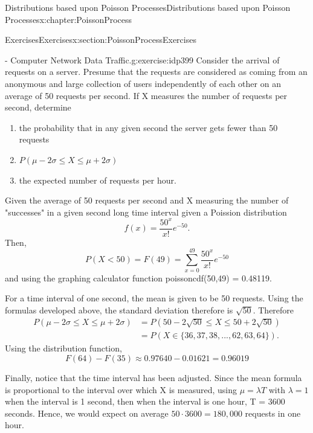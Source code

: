\documentclass[oneside,10pt,]{book}
\numberwithin{equation}{section}
\newcommand{\lt}{<}
\begin{document}
\begin{chapterptx}{Distributions based upon Poisson Processes}{}{Distributions based upon Poisson Processes}{}{}{x:chapter:PoissonProcess}
\begin{sectionptx}{Exercises}{}{Exercises}{}{}{x:section:PoissonProcessExercises}
\begin{inlineexercise}{- Computer Network Data Traffic.}{g:exercise:idp399}
Consider the arrival of requests on a server. Presume that the requests are considered as coming from an anonymous and large collection of users independently of each other on an average of 50 requests per second. If X measures the number of requests per second, determine%
\begin{enumerate}
\item{}the probability that in any given second the server gets fewer than 50 requests%
\item{}\(\displaystyle P(\mu - 2\sigma \le X \le \mu + 2\sigma)\)%
\item{}the expected number of requests per hour.%
\end{enumerate}
%
\par\smallskip%
\noindent\hypertarget{g:solution:idp400}{}Given the average of 50 requests per second and X measuring the number of "successes" in a given second long time interval given a Poission distribution%
\begin{equation*}
f(x) = \frac{50^x}{x!}e^{-50}.
\end{equation*}
Then,%
\begin{equation*}
P(X \lt 50) = F(49) = \sum_{x=0}^{49} \frac{50^x}{x!} e^{-50}
\end{equation*}
and using the graphing calculator function poissoncdf(50,49) = 0.48119.%
\par
For a time interval of one second, the mean is given to be 50 requests. Using the formulas developed above, the standard deviation therefore is \(\sqrt{50}\). Therefore%
\begin{align*}
P(\mu - 2\sigma \le X \le \mu + 2\sigma) & = P(50 - 2\sqrt{50} \le X \le 50 + 2\sqrt{50})\\
& = P(X \in \{ 36, 37, 38, ..., 62, 63, 64 \}).
\end{align*}
Using the distribution function,%
\begin{equation*}
F(64) - F(35) \approx 0.97640 - 0.01621 = 0.96019
\end{equation*}
%
\par
Finally, notice that the time interval has been adjusted. Since the mean formula is proportional to the interval over which X is measured, using \(\mu = \lambda T\) with \(\lambda = 1\) when the interval is 1 second, then when the interval is one hour, T = 3600 seconds. Hence, we would expect on average \(50 \cdot 3600 = 180,000\) requests in one hour.%
\end{inlineexercise}%
\end{sectionptx}
\end{chapterptx}
\end{document}
